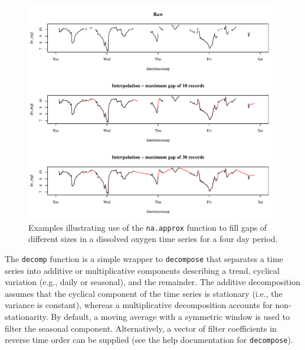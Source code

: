 \documentclass[10pt,letterpaper]{article}\usepackage[]{graphicx}\usepackage[]{color}
\makeatletter
\def\maxwidth{ %
  \ifdim\Gin@nat@width>\linewidth
    \linewidth
  \else
    \Gin@nat@width
  \fi
}
\newenvironment{knitrout}{}{} %
\makeatother
\begin{document}
\begin{knitrout}
\begin{figure}[!ht]
{\centering \includegraphics[width=\maxwidth]{figure/interp_ex} 

}

\caption[Examples illustrating use of the \texttt{na.approx} function to fill gaps of different sizes in a dissolved oxygen time series for a four day period.]{Examples illustrating use of the \texttt{na.approx} function to fill gaps of different sizes in a dissolved oxygen time series for a four day period.\label{fig:interp_ex}}
\end{figure}


\end{knitrout}

The \texttt{decomp} function is a simple wrapper to \texttt{decompose} that separates a time series into additive or multiplicative components describing a trend, cyclical variation (e.g., daily or seasonal), and the remainder.  The additive decomposition assumes that the cyclical component of the time series is stationary (i.e., the variance is constant), whereas a multiplicative decomposition accounts for non-stationarity.  By default, a moving average with a symmetric window is used to filter the seasonal component.  Alternatively, a vector of filter coefficients in reverse time order can be supplied (see the help documentation for \texttt{decompose}).  
\end{document}
